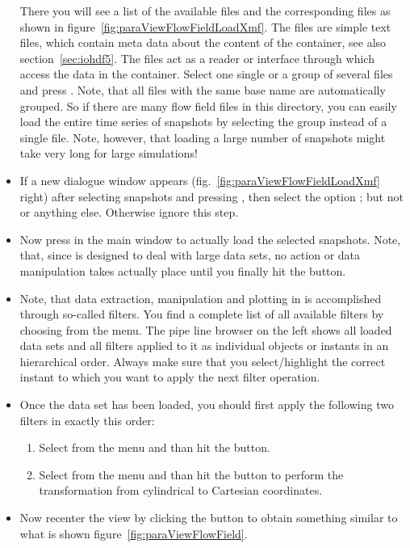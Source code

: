 \documentclass[a4paper, 11pt, DIV=11]{scrartcl}
\begin{document}
\begin{itemize}
There you will see a list of the available \hdf files and the corresponding \xmf
files as shown in figure~\ref{fig:paraViewFlowFieldLoadXmf}. The \xmf files are
simple text files, which contain meta data about the content of the \hdf container,
see also section~\ref{sec:iohdf5}. The \xmf files act as a reader or interface
through which \paraview access the data in the \hdf container. Select one single or
a group of several \xmf files and press . Note, that all files with the
same base name are automatically grouped. So if there are many flow field files in
this directory, you can easily load the entire time series of snapshots by selecting
the group instead of a single \xmf file. Note, however, that loading a large number
of snapshots might take very long for large simulations!
\item
If a new dialogue window appears (fig.~\ref{fig:paraViewFlowFieldLoadXmf}
right) after selecting snapshots and pressing , then select the
option ; but not 
or anything else. Otherwise ignore this step.
\item
Now press  in the main \paraview window to actually load the selected snapshots.
Note, that, since \paraview is designed to deal with large data sets, no action or data
manipulation takes actually place until you finally hit the  button.
\item
Note, that data extraction, manipulation and plotting in \paraview is accomplished
through so-called filters. You find a complete list of all available filters by
choosing  from the menu. The pipe line browser
on the left shows all loaded data sets and all filters applied to it as individual
objects or instants in an hierarchical order. Always make sure that you select/highlight
the correct instant to which you want to apply the next filter operation.
\item
Once the data set has been loaded, you should first apply the following
two filters in exactly this order:
\begin{enumerate}
\item
Select  from the menu
and than hit the  button.
\item
Select  from
the menu and than hit the  button to perform the transformation
from cylindrical to Cartesian coordinates.
\end{enumerate}
\item Now recenter the view by clicking the  button to
obtain something similar to what is shown figure~\ref{fig:paraViewFlowField}.
\end{itemize}
\end{document}
